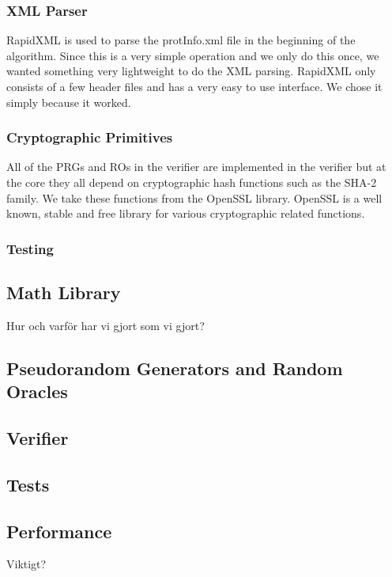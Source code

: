 \subsubsection{XML Parser}

RapidXML is used to parse the protInfo.xml file in the beginning of the algorithm. Since this is a very simple operation and we only do this once, we wanted something very lightweight to do the XML parsing. RapidXML only consists of a few header files and has a very easy to use interface. We chose it simply because it worked.

\subsubsection{Cryptographic Primitives}

All of the PRGs and ROs in the verifier are implemented in the verifier but at the core they all depend on cryptographic hash functions such as the SHA-2 family. We take these functions from the OpenSSL library. OpenSSL is a well known, stable and free library for various cryptographic related functions.

\subsubsection{Testing}



\subsection{Math Library}

Hur och varför har vi gjort som vi gjort?

\subsection{Pseudorandom Generators and Random Oracles}

\subsection{Verifier}

\subsection{Tests}

\subsection{Performance}

Viktigt?
